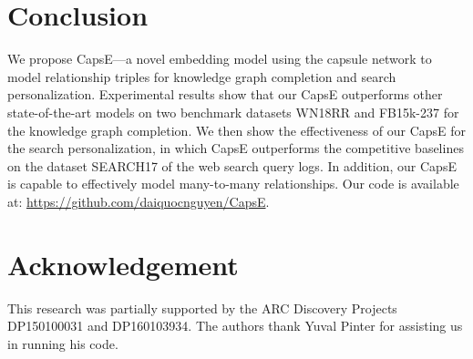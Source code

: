 \documentclass[11pt,a4paper]{article}
\begin{document}
\section{Conclusion}
\label{sec:conclusion}

We propose CapsE---a novel embedding model using the capsule network to model relationship triples for knowledge graph completion and search personalization.
Experimental results show that our CapsE outperforms other state-of-the-art models on two benchmark datasets WN18RR and FB15k-237 for the knowledge graph completion.
We then show the effectiveness of our CapsE for the search personalization, in which CapsE outperforms the competitive baselines on the dataset SEARCH17 of the web search query logs. 
In addition, our CapsE is capable to effectively model many-to-many relationships. 
Our code is available at: \url{https://github.com/daiquocnguyen/CapsE}.

\section*{Acknowledgement}
This research was partially supported by the ARC Discovery Projects DP150100031 and DP160103934.
The authors thank Yuval Pinter for assisting us in running his code.



\end{document}
